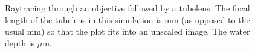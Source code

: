 \begin{figure}[!hbt]
  \centering
  \caption{Raytracing through an objective followed by a tubelens. The
    focal length of the tubelens in this simulation is \unit[16]{mm}
    (as opposed to the usual \unit[160]{mm}) so that the plot fits
    into an unscaled image. The water depth is \unit[10]{$\mu$m}.}
  \label{fig:screen_microscope-aberrate-front}
\end{figure}
